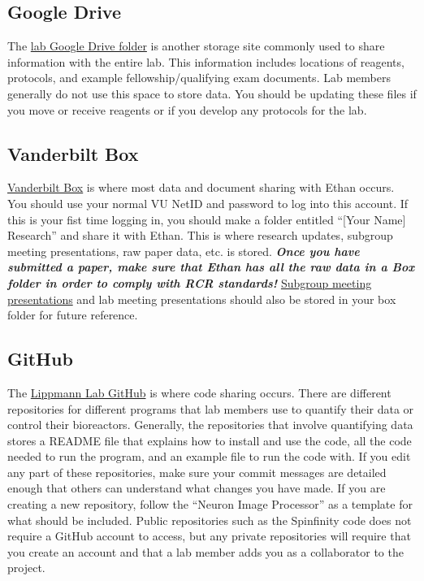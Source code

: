 \documentclass[
]{book}
\begin{document}
\hypertarget{googledrive}{%
\subsection{Google Drive}\label{googledrive}}

The \href{https://drive.google.com/drive/folders/0Bwvn9S-4oeMmeHhzUS1nM0FNak0?usp=sharing}{lab Google Drive folder} is another storage site commonly used to share information with the entire lab. This information includes locations of reagents, protocols, and example fellowship/qualifying exam documents. Lab members generally do not use this space to store data. You should be updating these files if you move or receive reagents or if you develop any protocols for the lab.

\hypertarget{vanderbiltbox}{%
\subsection{Vanderbilt Box}\label{vanderbiltbox}}

\href{https://vanderbilt.account.box.com/login}{Vanderbilt Box} is where most data and document sharing with Ethan occurs. You should use your normal VU NetID and password to log into this account. If this is your fist time logging in, you should make a folder entitled ``{[}Your Name{]} Research'' and share it with Ethan. This is where research updates, subgroup meeting presentations, raw paper data, etc. is stored. \textbf{\emph{Once you have submitted a paper, make sure that Ethan has all the raw data in a Box folder in order to comply with RCR standards!}} \protect\hyperlink{subgroup}{Subgroup meeting presentations} and lab meeting presentations should also be stored in your box folder for future reference.

\hypertarget{github}{%
\subsection{GitHub}\label{github}}

The \href{https://github.com/lippmannlab}{Lippmann Lab GitHub} is where code sharing occurs. There are different repositories for different programs that lab members use to quantify their data or control their bioreactors. Generally, the repositories that involve quantifying data stores a README file that explains how to install and use the code, all the code needed to run the program, and an example file to run the code with. If you edit any part of these repositories, make sure your commit messages are detailed enough that others can understand what changes you have made. If you are creating a new repository, follow the ``Neuron Image Processor'' as a template for what should be included. Public repositories such as the Spinfinity code does not require a GitHub account to access, but any private repositories will require that you create an account and that a lab member adds you as a collaborator to the project.
\end{document}
